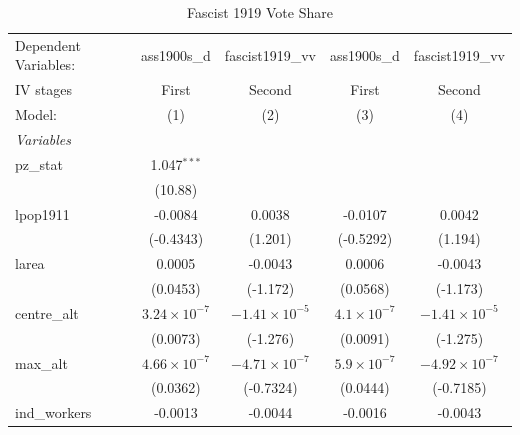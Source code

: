 
\begin{table}[htbp]
   \caption{Fascist 1919 Vote Share}
   \centering
   \begin{tabular}{lcccc}
      \tabularnewline \midrule \midrule
      Dependent Variables:             & ass1900s\_d           & fascist1919\_vv        & ass1900s\_d          & fascist1919\_vv\\   
      IV stages                        & First                 & Second                 & First                & Second \\   
      Model:                           & (1)                   & (2)                    & (3)                  & (4)\\  
      \midrule
      \emph{Variables}\\
      pz\_stat                         & 1.047$^{***}$         &                        &                      &   \\   
                                       & (10.88)               &                        &                      &   \\   
      lpop1911                         & -0.0084               & 0.0038                 & -0.0107              & 0.0042\\   
                                       & (-0.4343)             & (1.201)                & (-0.5292)            & (1.194)\\   
      larea                            & 0.0005                & -0.0043                & 0.0006               & -0.0043\\   
                                       & (0.0453)              & (-1.172)               & (0.0568)             & (-1.173)\\   
      centre\_alt                      & $3.24\times 10^{-7}$  & $-1.41\times 10^{-5}$  & $4.1\times 10^{-7}$  & $-1.41\times 10^{-5}$\\    
                                       & (0.0073)              & (-1.276)               & (0.0091)             & (-1.275)\\   
      max\_alt                         & $4.66\times 10^{-7}$  & $-4.71\times 10^{-7}$  & $5.9\times 10^{-7}$  & $-4.92\times 10^{-7}$\\    
                                       & (0.0362)              & (-0.7324)              & (0.0444)             & (-0.7185)\\   
      ind\_workers                     & -0.0013               & -0.0044                & -0.0016              & -0.0043\\   

\end{tabular}
\end{table}
